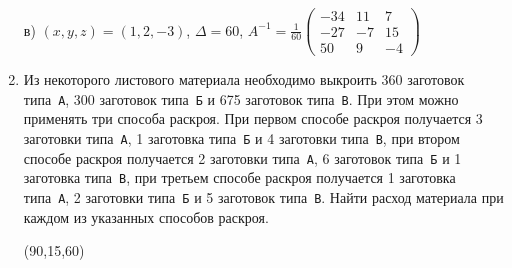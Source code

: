 \documentclass[a5paper,11pt]{extarticle}
\begin{document}
\begin{enumerate}
{		в)
		\underline{$(x,y,z)=(1,2,-3)$},\quad
		$\Delta=60$, \quad
		$A^{-1}
			=\frac{1}{60}
			\begin{pmatrix}
				-34 & 11 & 7\\
				-27 & -7 & 15\\
				50 & 9 & -4
			\end{pmatrix}
			$
\par}

\item
	Из  некоторого  листового  материала  необходимо  выкроить  360  заготовок типа~\texttt{А},  300  заготовок  типа~\texttt{Б}  и  675  заготовок  типа~\texttt{В}.  При  этом можно применять  три  способа  раскроя.  При  первом  способе  раскроя  получается  3 заготовки типа~\texttt{А}, 1 заготовка типа~\texttt{Б} и 4 заготовки типа~\texttt{В}, при втором способе раскроя получается 2 заготовки типа~\texttt{А}, 6 заготовок типа~\texttt{Б} и 1 заготовка  типа~\texttt{В},  при  третьем  способе  раскроя  получается  1  заготовка  типа~\texttt{А},  2  заготовки типа~\texttt{Б} и 5 заготовок типа~\texttt{В}. Найти расход материала при каждом из указанных способов раскроя.
	
	{\raggedleft (90,15,60)\par}
	


\end{enumerate}
\end{document}
